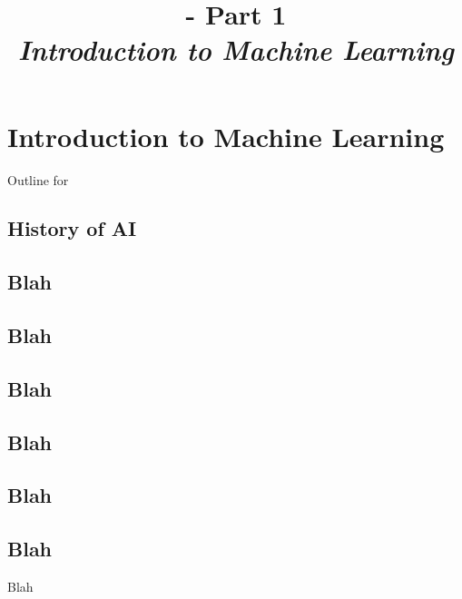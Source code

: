 \renewcommand{\prevlecture}{0 }
\renewcommand{\thislecture}{1 }
\renewcommand{\nextlecture}{2 }

\section{Introduction to Machine Learning}

%
%

\title[\modulename - Part \thislecture]
{ 
  {\bf 
   \modulename - 
    Part \thislecture\\
  }
  \vspace{0.5cm}
  {\it 
   \color{yellow}
    Introduction to Machine Learning\\
  }
}



\begin{frame}[plain]
  \titlepage
\end{frame}

\begin{frame}{Outline for \secname}
    \tableofcontents[currentsection, hideothersubsections, sectionstyle=show/show]
\end{frame}


\subsection{History of AI}
\subsection{Blah}
\subsection{Blah}
\subsection{Blah}
\subsection{Blah}
\subsection{Blah}
\subsection{Blah}


\begin{frame}{Blah}

\end{frame}

\renewcommand{\lecturesummarytitle}{Main points to remember }






